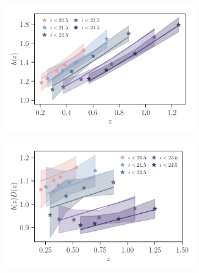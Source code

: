 \documentclass[a4paper,11pt]{article}
\begin{document}
    \begin{figure}
      \begin{center}
        \begin{subfigure}{0.48\textwidth}
        \includegraphics[width=0.9\textwidth]{figures/bias-redshift_mPk=HOD_fix=alpha-fc-sigmaM_HOD=zevol_fit=pz-shifts-pz-widths+prior=0p2_fit=auto+cross_cosmo=const_cov=G+NG+SSC-LINBIAS_HOD-param=zfid_clfit=HOD-zevol_magnitude_cuts_fitting-func.pdf}
        \end{subfigure}
        \begin{subfigure}{0.48\textwidth}
        \includegraphics[width=0.9\textwidth]{figures/bias-growth-redshift_mPk=HOD_fix=alpha-fc-sigmaM_HOD=zevol_fit=pz-shifts-pz-widths+prior=0p2_fit=auto+cross_cosmo=const_cov=G+NG+SSC-LINBIAS_HOD-param=zfid_clfit=HOD-zevol_magnitude_cuts_fitting-func.pdf}
        \end{subfigure}
       \begin{subfigure}{0.48\textwidth}

\end{subfigure}
\end{center}
\end{figure}
\end{document}
